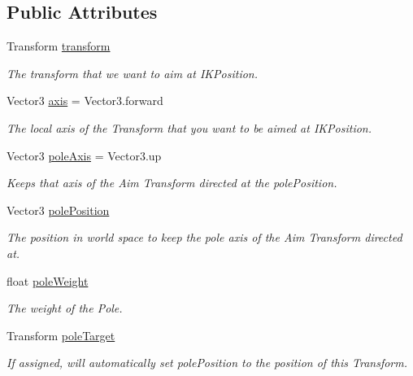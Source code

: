 \subsection*{Public Attributes}
\begin{DoxyCompactItemize}
\item 
Transform \mbox{\hyperlink{class_root_motion_1_1_final_i_k_1_1_i_k_solver_aim_ad6f81e751d6eec2cf869e5f58cf88447}{transform}}
\begin{DoxyCompactList}\small\item\em The transform that we want to aim at I\+K\+Position. \end{DoxyCompactList}\item 
Vector3 \mbox{\hyperlink{class_root_motion_1_1_final_i_k_1_1_i_k_solver_aim_ac1ffdbd44a0254be3d72828bc0bd11df}{axis}} = Vector3.\+forward
\begin{DoxyCompactList}\small\item\em The local axis of the Transform that you want to be aimed at I\+K\+Position. \end{DoxyCompactList}\item 
Vector3 \mbox{\hyperlink{class_root_motion_1_1_final_i_k_1_1_i_k_solver_aim_a811b744d5627bd7dfcb69ae08a4c97d7}{pole\+Axis}} = Vector3.\+up
\begin{DoxyCompactList}\small\item\em Keeps that axis of the Aim Transform directed at the pole\+Position. \end{DoxyCompactList}\item 
Vector3 \mbox{\hyperlink{class_root_motion_1_1_final_i_k_1_1_i_k_solver_aim_a5442b95ebced2ae6fe00b1deab40d424}{pole\+Position}}
\begin{DoxyCompactList}\small\item\em The position in world space to keep the pole axis of the Aim Transform directed at. \end{DoxyCompactList}\item 
float \mbox{\hyperlink{class_root_motion_1_1_final_i_k_1_1_i_k_solver_aim_ae7f291710b7fcc0b68d54aa22fa6ce0a}{pole\+Weight}}
\begin{DoxyCompactList}\small\item\em The weight of the Pole. \end{DoxyCompactList}\item 
Transform \mbox{\hyperlink{class_root_motion_1_1_final_i_k_1_1_i_k_solver_aim_a5b48ef967484730e0be491a6049f784d}{pole\+Target}}
\begin{DoxyCompactList}\small\item\em If assigned, will automatically set pole\+Position to the position of this Transform. \end{DoxyCompactList}\item 

\end{DoxyCompactItemize}
